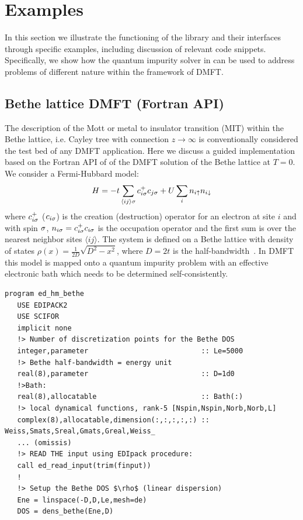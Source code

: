 \section{Examples}\label{SecExamples}
In this section we illustrate the functioning of the \NAME
library and their interfaces through specific examples, including
discussion of relevant code snippets.
Specifically, we show how the quantum impurity solver in \NAME can be used
to address problems of different nature within the framework of DMFT. 


\subsection{Bethe lattice DMFT (Fortran API)}\label{SecExamplesBetheDMFT}
The description of the Mott or metal to insulator transition (MIT)
within the Bethe lattice, i.e. Cayley tree with connection
$z\to\infty$ is conventionally considered the test bed of any DMFT
application. Here  we discuss a guided implementation based on the
Fortran API of \NAME of the DMFT solution of the Bethe lattice at
$T=0$. 
We consider a Fermi-Hubbard model:
$$
H = -t \sum_{\langle ij\rangle\sigma}c^+_{i\sigma}c_{j\sigma} + U \sum_i n_{i\uparrow}n_{i\downarrow}
$$
where $c^+_{i\sigma}$ ($c_{i\sigma}$) is the creation (destruction) operator for an electron at site $i$
and with spin $\sigma$, $n_{i\sigma}=c^+_{i\sigma}c_{i\sigma}$ is the occupation
operator and the first sum is over the nearest neighbor sites $\langle
ij\rangle$. 
The system is defined on a Bethe lattice with density of states
$\rho(x)=\frac{1}{2D}\sqrt{D^2-x^2}$, where $D=2t$ is the
half-bandwidth~\cite{Georges1996}.
In DMFT this model is mapped
onto a quantum impurity problem with an effective electronic bath
which needs to be determined self-consistently.
\begin{lstlisting}[style=fstyle,numbers=none,basicstyle={\scriptsize\ttfamily}]
program ed_hm_bethe
   USE EDIPACK2
   USE SCIFOR
   implicit none
   !> Number of discretization points for the Bethe DOS
   integer,parameter                           :: Le=5000
   !> Bethe half-bandwidth = energy unit
   real(8),parameter                           :: D=1d0
   !>Bath:
   real(8),allocatable                         :: Bath(:)
   !> local dynamical functions, rank-5 [Nspin,Nspin,Norb,Norb,L]
   complex(8),allocatable,dimension(:,:,:,:,:) :: Weiss,Smats,Sreal,Gmats,Greal,Weiss_
   ... (omissis)
   !> READ THE input using EDIpack procedure:
   call ed_read_input(trim(finput))
   !
   !> Setup the Bethe DOS $\rho$ (linear dispersion)
   Ene = linspace(-D,D,Le,mesh=de)
   DOS = dens_bethe(Ene,D)
\end{lstlisting}

